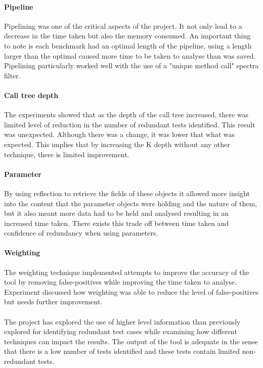 \paragraph{Pipeline}
Pipelining was one of the critical aspects of the project. It not only lead to a decrease in the time taken but also the memory consumed. An important thing to note is each benchmark had an optimal length of the pipeline, using a length larger than the optimal caused more time to be taken to analyse than was saved. Pipelining particularly worked well with the use of a "unique method call" spectra filter.

\paragraph{Call tree depth}
The experiments showed that as the depth of the call tree increased, there was limited level of reduction in the number of redundant tests identified. This result was unexpected. Although there was a change, it was lower that what was expected. This implies that by increasing the K depth without any other technique, there is limited improvement. 

\paragraph{Parameter}
By using reflection to retrieve the fields of these objects it allowed more insight into the content that the parameter objects were holding and the nature of them, but it also meant more data had to be held and analysed resulting in an increased time taken. There exists this trade off between time taken and confidence of redundancy when using parameters. 

\paragraph{Weighting}
The weighting technique implemented attempts to improve the accuracy of the tool by removing false-positives while improving the time taken to analyse. Experiment  discussed how weighting was able to reduce the level of false-positives but needs further improvement.

\paragraph{}
The project has explored the use of higher level information than previously explored for identifying redundant test cases while examining how different techniques can impact the results. The output of the tool is adequate in the sense that there is a low number of tests identified and these tests contain limited non-redundant tests. 


